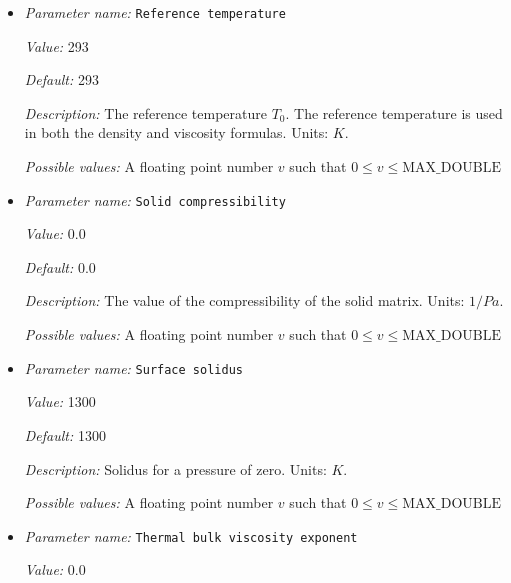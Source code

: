 \begin{itemize}
{\it Default:} 1250


{\it Description:} The value of the specific heat $C_p$. Units: $J/kg/K$.


{\it Possible values:} A floating point number $v$ such that $0 \leq v \leq \text{MAX\_DOUBLE}$
\item {\it Parameter name:} {\tt Reference temperature}
\label{parameters:Material model/Melt global/Reference temperature}


{\it Value:} 293


{\it Default:} 293


{\it Description:} The reference temperature $T_0$. The reference temperature is used in both the density and viscosity formulas. Units: $K$.


{\it Possible values:} A floating point number $v$ such that $0 \leq v \leq \text{MAX\_DOUBLE}$
\item {\it Parameter name:} {\tt Solid compressibility}
\label{parameters:Material model/Melt global/Solid compressibility}


{\it Value:} 0.0


{\it Default:} 0.0


{\it Description:} The value of the compressibility of the solid matrix. Units: $1/Pa$.


{\it Possible values:} A floating point number $v$ such that $0 \leq v \leq \text{MAX\_DOUBLE}$
\item {\it Parameter name:} {\tt Surface solidus}
\label{parameters:Material model/Melt global/Surface solidus}


{\it Value:} 1300


{\it Default:} 1300


{\it Description:} Solidus for a pressure of zero. Units: $K$.


{\it Possible values:} A floating point number $v$ such that $0 \leq v \leq \text{MAX\_DOUBLE}$
\item {\it Parameter name:} {\tt Thermal bulk viscosity exponent}
\label{parameters:Material model/Melt global/Thermal bulk viscosity exponent}


{\it Value:} 0.0



\end{itemize}
